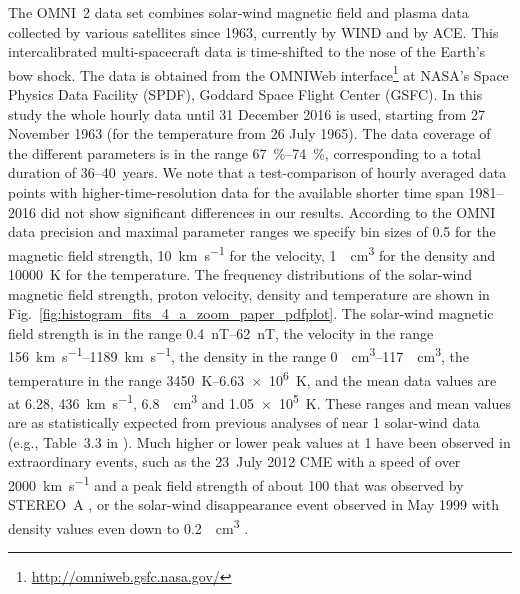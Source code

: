 \documentclass[]{aa}
\begin{document}
        The OMNI~2 data set \citep{King2005} combines solar-wind magnetic field and plasma data collected by various satellites since 1963, currently by WIND and by ACE. This intercalibrated multi-spacecraft data is time-shifted to the nose of the Earth’s bow shock. The data is obtained from the OMNIWeb interface\footnote{\url{http://omniweb.gsfc.nasa.gov/}} at NASA's Space Physics Data Facility (SPDF), Goddard Space Flight Center (GSFC).
        In this study the whole hourly data until 31 December 2016 is used, starting from 27 November 1963 (for the temperature from 26 July 1965). The data coverage of the different parameters is in the range \SIrange{67}{74}{\percent},  corresponding to a total duration of 36--40~years.
        We note that a test-comparison of hourly averaged data points with higher-time-resolution data for the available shorter time span 1981--2016 did not show significant differences in our results.        According to the OMNI data precision and maximal parameter ranges we specify bin sizes of \SI{0.5}{\nT} for the magnetic field strength, \SI{10}{\km\per\s} for the velocity, \SI{1}{\per\cm\cubed} for the density and \SI{10000}{\K} for the temperature. The frequency distributions of the solar-wind magnetic field strength, proton velocity, density and temperature are shown in Fig.~\ref{fig:histogram_fits_4_a_zoom_paper_pdfplot}.
        The solar-wind magnetic field strength is in the range \SIrange{0.4}{62}{nT}, the velocity in the range \SIrange{156}{1189}{\km\per\s}, the density in the range \SIrange{0}{117}{\per\cm\cubed}, the temperature in the range \SIrange{3450}{6.63e6}{\K}, and the mean data values are at \SI{6.28}{\nT}, \SI{436}{\km\per\s}, \SI{6.8}{\per\cm\cubed} and \SI{1.05e5}{\K}. These ranges and mean values are as statistically expected from previous analyses of near \SI{1}{\au} solar-wind data (e.g., Table~3.3 in \citet[p.~39]{Bothmer2007}).
        Much higher or lower peak values at \SI{1}{\au} have been observed in extraordinary events, such as the 23~July 2012 CME with a speed of over \SI{2000}{\km\per\s} and a peak field strength of about \SI{100}{\nT} that was observed by STEREO~A \citep{Russell2013}, or the solar-wind disappearance event observed in May 1999 with density values even down to \SI{0.2}{\per\cm\cubed} \citep{Lazarus2000}.
\end{document}
